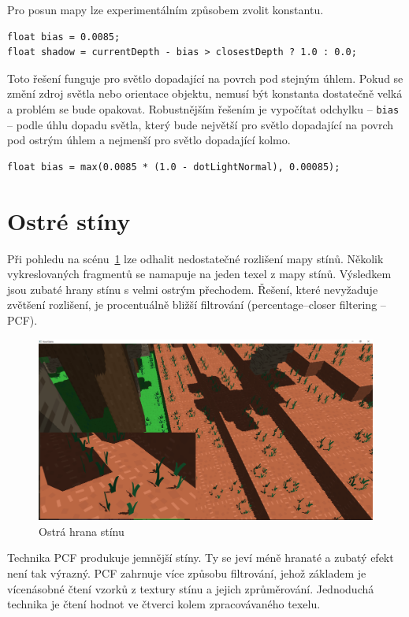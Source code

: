 \documentclass[thesis=M,czech]{FITthesis}[2019/12/23]
\begin{document}
Pro posun mapy lze experimentálním způsobem zvolit konstantu.

\begin{verbatim}
float bias = 0.0085;
float shadow = currentDepth - bias > closestDepth ? 1.0 : 0.0;
\end{verbatim}

Toto řešení funguje pro světlo dopadající na povrch pod stejným úhlem. Pokud se změní zdroj světla nebo orientace objektu, nemusí být konstanta dostatečně velká a problém se bude opakovat. Robustnějším řešením je vypočítat odchylku -- \texttt{bias} -- podle úhlu dopadu světla, který bude největší pro světlo dopadající na povrch pod ostrým úhlem a nejmenší pro světlo dopadající kolmo.

\begin{verbatim}
float bias = max(0.0085 * (1.0 - dotLightNormal), 0.00085);
\end{verbatim}

\section{Ostré stíny}

Při pohledu na scénu~\ref{fig:shadows_pcf_hard} lze odhalit nedostatečné rozlišení mapy stínů. Několik vykreslovaných fragmentů se namapuje na jeden texel z mapy stínů. Vý\-sled\-kem jsou zubaté hrany stínu s velmi ostrým přechodem. Řešení, které nevyžaduje zvětšení rozlišení, je procentuálně bližší filtrování (percentage--closer filtering -- PCF).

\begin{figure}\centering
	\includegraphics[width=\textwidth]{images/shadows/pcf_hard}
	\caption[Ostrá hrana stínu]{Ostrá hrana stínu}\label{fig:shadows_pcf_hard}
\end{figure}

Technika PCF produkuje jemnější stíny. Ty se jeví méně hranaté a zubatý efekt není tak výrazný. PCF zahrnuje více způsobu filtrování, jehož základem je vícenásobné čtení vzorků z textury stínu a jejich zprůměrování. Jednoduchá technika je čtení hodnot ve čtverci kolem zpracovávaného texelu.
\end{document}
